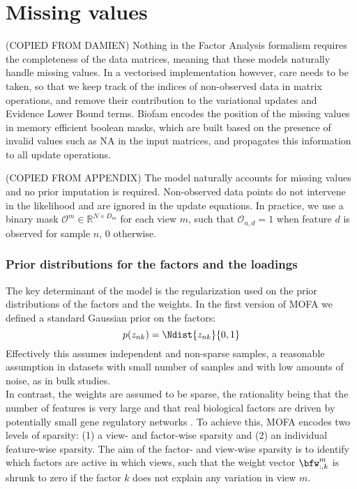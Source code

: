 \section{Missing values}

(COPIED FROM DAMIEN) Nothing in the Factor Analysis formalism requires the completeness of the data matrices, meaning that these models naturally handle missing values. In a vectorised implementation however, care needs to be taken, so that we keep track of the indices of non-observed data in matrix operations, and remove their contribution to the variational updates and Evidence Lower Bound terms. Biofam encodes the position of the missing values in memory efficient boolean masks, which are built based on the presence of invalid values such as NA in the input matrices, and propagates this information to all update operations.

(COPIED FROM APPENDIX) The model naturally accounts for missing values and no prior imputation is required. Non-observed data points do not intervene in the likelihood and are ignored in the update equations. In practice, we use a binary mask $\mathcal{O}^m \in \mathbb{R}^{N\times D_m}$ for each view $m$, such that $\mathcal{O}_{n,d} = 1$ when feature $d$ is observed for sample $n$, 0 otherwise.

\subsubsection{Prior distributions for the factors and the loadings}
The key determinant of the model is the regularization used on the prior distributions of the factors and the weights. In the first version of MOFA we defined a standard Gaussian prior on the factors:
\begin{equation}
	p(z_{nk}) = \Ndist{z_{nk}}{0,1}
\end{equation}
Effectively this assumes independent and non-sparse samples, a reasonable assumption in datasets with small number of samples and with low amounts of noise, as in bulk studies. \\
In contrast, the weights are assumed to be sparse, the rationality being that the number of features is very large and that real biological factors are driven by potentially small gene regulatory networks \cite{Gao2013}. To achieve this, MOFA encodes two levels of sparsity: (1) a view- and factor-wise sparsity and (2) an individual feature-wise sparsity. The aim of the factor- and view-wise sparsity is to identify which factors are active in which views, such that the weight vector $\bfw_{:,k}^m$ is shrunk to zero if the factor $k$ does not explain any variation in view $m$. \\

